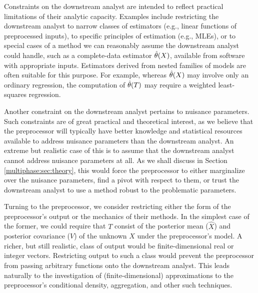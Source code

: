 Constraints on the downstream analyst are intended to reflect practical limitations of their analytic capacity.
Examples  include restricting the downstream analyst to narrow classes of estimators (e.g., linear functions of preprocessed inputs), to specific principles of estimation (e.g., MLEs), or to special cases of a method we can reasonably assume the downstream analyst could handle, such as a complete-data estimator $\hat{\theta}(X)$, available from software with appropriate inputs.
Estimators derived from nested families of models are often suitable for this purpose.
For example, whereas $\hat{\theta}(X)$ may involve only an ordinary regression, the computation of  $\hat{\theta}(T)$ may require  a weighted least-squares regression.

Another constraint on the downstream analyst pertains to nuisance parameters.
Such constraints are of great practical and theoretical interest, as we believe that the preprocessor will typically have better knowledge and statistical resources available to address nuisance parameters than the downstream analyst.
An extreme but realistic case of this is to assume that the downstream analyst cannot address nuisance parameters at all.
As we shall discuss in Section \ref{multiphase:sec:theory}, this would force the preprocessor to either marginalize over the nuisance parameters, find a pivot with respect to them, or trust the downstream analyst to use a method robust to the problematic parameters.

Turning to the preprocessor, we consider restricting either the form of the preprocessor's output or the mechanics of their methods.
In the simplest case of the former, we could require that $T$ consist of the posterior mean ($\hat{X}$) and posterior covariance ($V$) of the unknown $X$ under the preprocessor's model.
A richer, but still realistic, class of output would be finite-dimensional real or integer vectors.
Restricting output to such a class would prevent the preprocessor from passing arbitrary functions onto the downstream analyst.
This leads naturally to the investigation of (finite-dimensional) approximations to the preprocessor's conditional density, aggregation, and other such techniques.

